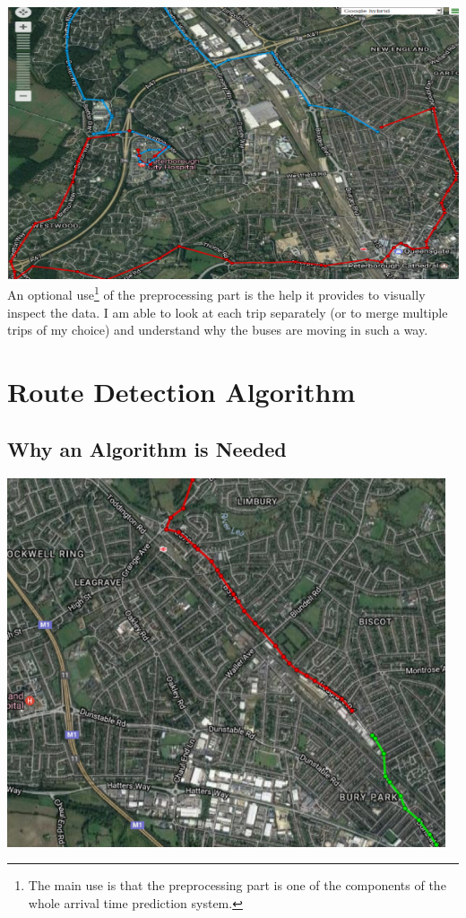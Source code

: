 \documentclass[12pt,a4paper,oneside,openright]{report}
\begin{document}
\includegraphics[width=\textwidth]{figs/processed.png} \\

An optional use\footnote{The main use is that the preprocessing part is one of the
components of the whole arrival time prediction system.} of the preprocessing part
is the help it provides to visually inspect the data. I am able to look at each trip
separately (or to merge multiple trips of my choice) and understand why the buses are
moving in such a way.

\section{Route Detection Algorithm}

\subsection{Why an Algorithm is Needed}

\includegraphics[scale=0.8]{figs/route_detector.png} \\
\end{document}
